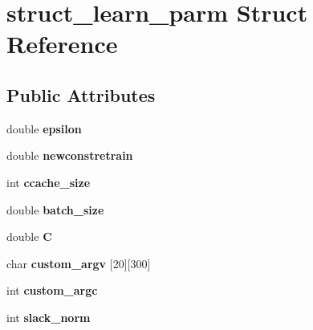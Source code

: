 \hypertarget{structstruct__learn__parm}{}\section{struct\+\_\+learn\+\_\+parm Struct Reference}
\label{structstruct__learn__parm}
\subsection*{Public Attributes}
\begin{DoxyCompactItemize}
\item 
\hypertarget{structstruct__learn__parm_ab197c9f1edc4f3c61e18d5924b263fb6}{}double {\bfseries epsilon}\label{structstruct__learn__parm_ab197c9f1edc4f3c61e18d5924b263fb6}

\item 
\hypertarget{structstruct__learn__parm_addf13087b37361b6add4c7c0b38d3f67}{}double {\bfseries newconstretrain}\label{structstruct__learn__parm_addf13087b37361b6add4c7c0b38d3f67}

\item 
\hypertarget{structstruct__learn__parm_ab7641a8121c782c844ed42783dc784ea}{}int {\bfseries ccache\+\_\+size}\label{structstruct__learn__parm_ab7641a8121c782c844ed42783dc784ea}

\item 
\hypertarget{structstruct__learn__parm_a55440dbeaa3170b44376bd702bd90859}{}double {\bfseries batch\+\_\+size}\label{structstruct__learn__parm_a55440dbeaa3170b44376bd702bd90859}

\item 
\hypertarget{structstruct__learn__parm_a1fac9232d6bc5249301e44b3c9ad1a5d}{}double {\bfseries C}\label{structstruct__learn__parm_a1fac9232d6bc5249301e44b3c9ad1a5d}

\item 
\hypertarget{structstruct__learn__parm_ae4063c3f9e0a44a582c8684c6fbabe87}{}char {\bfseries custom\+\_\+argv} \mbox{[}20\mbox{]}\mbox{[}300\mbox{]}\label{structstruct__learn__parm_ae4063c3f9e0a44a582c8684c6fbabe87}

\item 
\hypertarget{structstruct__learn__parm_a1fcb92162965d9462b9ac227cd55a57c}{}int {\bfseries custom\+\_\+argc}\label{structstruct__learn__parm_a1fcb92162965d9462b9ac227cd55a57c}

\item 
\hypertarget{structstruct__learn__parm_a4fd959619ee2ba6cb6b87ac461a28097}{}int {\bfseries slack\+\_\+norm}\label{structstruct__learn__parm_a4fd959619ee2ba6cb6b87ac461a28097}


\end{DoxyCompactItemize}
